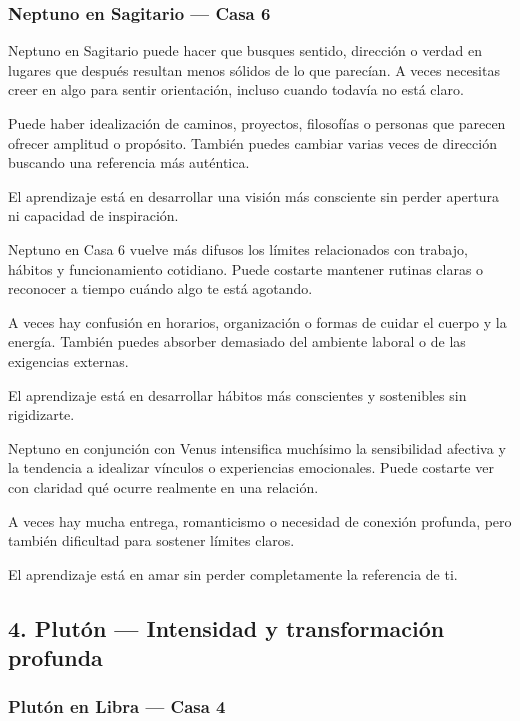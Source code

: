 \documentclass[11pt,a4paper]{article}
\begin{document}
\subsubsection*{Neptuno en Sagitario — Casa 6}

Neptuno en Sagitario puede hacer que busques sentido, dirección o verdad en lugares que después resultan menos sólidos de lo que parecían. A veces necesitas creer en algo para sentir orientación, incluso cuando todavía no está claro.

Puede haber idealización de caminos, proyectos, filosofías o personas que parecen ofrecer amplitud o propósito. También puedes cambiar varias veces de dirección buscando una referencia más auténtica.

El aprendizaje está en desarrollar una visión más consciente sin perder apertura ni capacidad de inspiración.

Neptuno en Casa 6 vuelve más difusos los límites relacionados con trabajo, hábitos y funcionamiento cotidiano. Puede costarte mantener rutinas claras o reconocer a tiempo cuándo algo te está agotando.

A veces hay confusión en horarios, organización o formas de cuidar el cuerpo y la energía. También puedes absorber demasiado del ambiente laboral o de las exigencias externas.

El aprendizaje está en desarrollar hábitos más conscientes y sostenibles sin rigidizarte.

Neptuno en conjunción con Venus intensifica muchísimo la sensibilidad afectiva y la tendencia a idealizar vínculos o experiencias emocionales. Puede costarte ver con claridad qué ocurre realmente en una relación.

A veces hay mucha entrega, romanticismo o necesidad de conexión profunda, pero también dificultad para sostener límites claros.

El aprendizaje está en amar sin perder completamente la referencia de ti.

\vspace{0.8cm}

\subsection{4. Plutón — Intensidad y transformación profunda}

\subsubsection*{Plutón en Libra — Casa 4}
\end{document}
